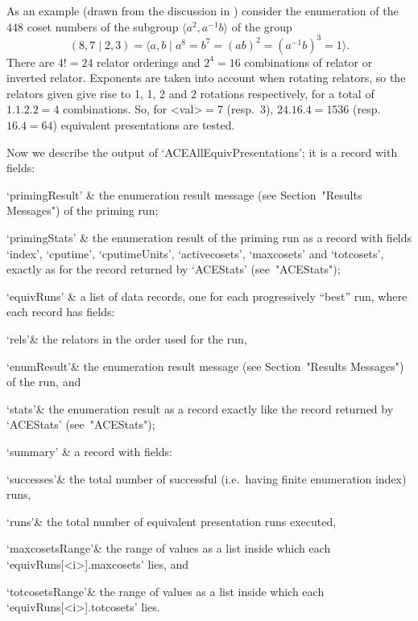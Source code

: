\endlist

As an example (drawn from the discussion in \cite{HR99a}) consider the
enumeration   of   the   $448$   coset   numbers   of   the   subgroup
$\langle  a^2,a^{-1}b \rangle$ of the group
$$
(8,7 \mid 2,3) 
    = \langle a,b \mid a^8 = b^7 = (ab)^2 = (a^{-1}b)^3 = 1 \rangle.
$$
There are $4!=24$  relator  orderings  and  $2^4=16$  combinations  of
relator or inverted relator. Exponents are  taken  into  account  when
rotating relators, so the relators given give rise to 1, 1,  2  and  2
rotations respectively, for a total of $1.1.2.2=4$  combinations.  So,
for  <val>${} = 7$   (resp.~$3$),   $24.16.4=1536$   (resp.~$16.4=64$)
equivalent presentations are tested.

Now we describe the output  of  `ACEAllEquivPresentations';  it  is  a
record with fields:

\beginitems

\quad`primingResult' & the  {\ACE}  enumeration  result  message  (see
Section~"Results Messages") of the priming run;

\quad`primingStats' & the enumeration result of the priming run  as  a
{\GAP}  record  with  fields   `index',   `cputime',   `cputimeUnits',
`activecosets', `maxcosets' and `totcosets', exactly as for the record
returned by `ACEStats' (see~"ACEStats");

\quad`equivRuns' & a list of data records, one for each  progressively
``best'' run, where each record has fields:

\qquad`rels'& the relators in the order used for the run,

\qquad`enumResult'&  the  {\ACE}  enumeration  result   message   (see
Section~"Results Messages") of the run, and

\qquad`stats'& the enumeration result as a {\GAP} record exactly  like
the record returned by `ACEStats' (see~"ACEStats");

\quad`summary' & a record with fields:

\qquad`successes'& the total number of successful (i.e.~having  finite
enumeration index) runs,

\qquad`runs'&  the  total  number  of  equivalent  presentation   runs
executed,

\qquad`maxcosetsRange'& the range of values as a  {\GAP}  list  inside
which each `equivRuns[<i>].maxcosets' lies, and

\qquad`totcosetsRange'& the range of values as a  {\GAP}  list  inside
which each `equivRuns[<i>].totcosets' lies.

